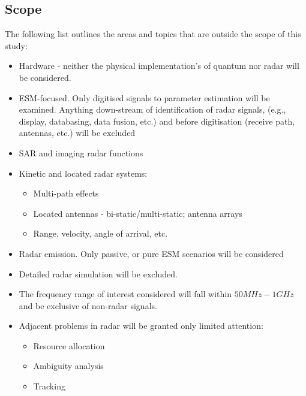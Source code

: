 \subsection{Scope}

The following list outlines the areas and topics that are outside the scope of this study:

\begin{itemize}
    \item Hardware - neither the physical implementation's of quantum nor radar will be considered.
    \item \ac{ESM}-focused. Only digitised signals to parameter estimation will be examined. Anything down-stream of identification of radar signals, (e.g., display, databasing, data fusion, etc.) and before digitisation (receive path, antennas, etc.) will be excluded
    \item \ac{SAR} and imaging radar functions
    \item Kinetic and located radar systems:
    \begin{itemize}
        \item Multi-path effects
        \item Located antennas - bi-static/multi-static; antenna arrays
        \item Range, velocity, angle of arrival, etc.
    \end{itemize}
    \item Radar emission. Only passive, or pure \ac{ESM} scenarios will be considered
    \item Detailed radar simulation will be excluded.
    \item The frequency range of interest considered will fall within \(50MHz - 1GHz\) and be exclusive of non-radar signals.
    \item Adjacent problems in radar will be granted only limited attention:
    \begin{itemize}
        \item Resource allocation
        \item Ambiguity analysis
        \item Tracking
    \end{itemize}
\end{itemize}

